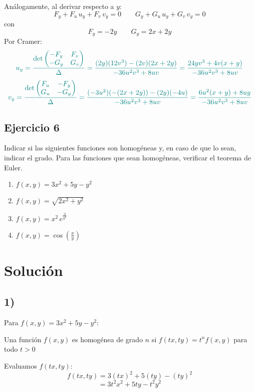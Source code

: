 \documentclass{article}
\begin{document}
Análogamente, al derivar respecto a \(y\):
\[
F_y + F_u\,u_y + F_v\,v_y = 0
\qquad
G_y + G_u\,u_y + G_v\,v_y = 0
\]
con
\[
F_y = -2y
\qquad
G_y = 2x + 2y
\]
Por Cramer:
\[
\color{teal}
u_y
=\frac{\det\begin{pmatrix} -F_y & F_v\\ -G_y & G_v \end{pmatrix}}{\Delta}
=\frac{(2y)(12v^3) - (2v)(2x+2y)}{-36u^2v^3+8uv}
=\frac{24yv^3 + 4v(x+y)}{-36u^2v^3+8uv}
\]
\[
\color{teal}
v_y
=\frac{\det\begin{pmatrix} F_u & -F_y\\ G_u & -G_y \end{pmatrix}}{\Delta}
=\frac{(-3u^2)(-(2x+2y)) - (2y)(-4u)}{-36u^2v^3+8uv}
=\frac{6u^2(x+y) + 8uy}{-36u^2v^3+8uv}
\]


\newpage


\subsection{Ejercicio 6}

Indicar si las siguientes funciones son homogéneas y, en caso de que lo sean, indicar el grado.  
Para las funciones que sean homogéneas, verificar el teorema de Euler.

\begin{enumerate}
  \item \(f(x,y) = 3x^2 + 5y - y^2\)
  \item \(f(x,y) = \sqrt{2x^2 + y^2}\)
  \item \(f(x,y) = x^2\,e^{\frac{3}{y^2}}\)
  \item \(f(x,y) = \cos\left(\frac{x}{y}\right)\)
\end{enumerate}

\newpage
\section*{Solución}

\subsection*{1)}

Para \(f(x,y) = 3x^2 + 5y - y^2\):

Una función \(f(x,y)\) es homogénea de grado \(n\) si \(f(tx,ty) = t^n f(x,y)\) para todo \(t > 0\)

Evaluamos \(f(tx,ty)\):
\[
f(tx,ty) = 3(tx)^2 + 5(ty) - (ty)^2
\]
\[
= 3t^2x^2 + 5ty - t^2y^2
\]
\end{document}
